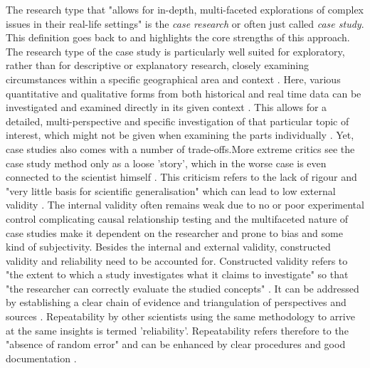 The research type that "allows for in-depth, multi-faceted explorations of complex issues in their real-life settings" \autocite{croweCaseStudyApproach2011} is the \textit{case research} or often just called \textit{case study}. This definition goes back to \autocite{yinCaseStudyResearch1984} and highlights the core strengths of this approach. The research type of the case study is particularly well suited for exploratory, rather than for descriptive or explanatory research, closely examining circumstances within a specific geographical area and context \autocite{zainalCaseStudyResearch2007}. Here, various quantitative and qualitative forms from both historical and real time data can be investigated and examined directly in its given context \autocite{fitzgeraldCaseStudiesResearch1999}. This allows for a detailed, multi-perspective and specific investigation of that particular topic of interest, which might not be given when examining the parts individually \autocite{pelzResearchMethodsSocial, zainalCaseStudyResearch2007}. Yet, case studies also comes with a number of trade-offs.\linebreak[1]
More extreme critics see the case study method only as a loose 'story', which in the worse case is even connected to the scientist himself \autocite{fitzgeraldCaseStudiesResearch1999}. This criticism refers to the lack of rigour and "very little basis for scientific generalisation" which can lead to low external validity \autocites{yinCaseStudyResearch1984}[5]{zainalCaseStudyResearch2007}. The internal validity often remains weak due to no or poor experimental control complicating causal relationship testing and the multifaceted nature of case studies make it dependent on the researcher and prone to bias and some kind of subjectivity. Besides the internal and external validity, constructed validity and reliability need to be accounted for. Constructed validity refers to "the extent to which a study investigates what it claims to investigate" \autocite[3]{gibbertWhatPassesRigorous2008} so that "the researcher can correctly evaluate the studied concepts" \autocite[277]{ferreiraHowImproveValidity2020}. It can be addressed by establishing a clear chain of evidence and triangulation of perspectives and sources \autocite{gibbertWhatPassesRigorous2008}. Repeatability by other scientists using the same methodology to arrive at the same insights is termed 'reliability'. Repeatability refers therefore to the "absence of random error" and can be enhanced by clear procedures and good documentation \autocite[5]{gibbertWhatPassesRigorous2008}.\linebreak[1]
